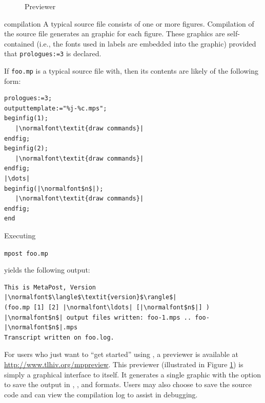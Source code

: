 \begin{figure}
	\begin{center}
		\caption{\MP{} Previewer}\label{fig:previewer}
	\end{center}
\end{figure}

\begin{section}{\MP{} compilation}
A typical \MP{} source file consists of one or more figures.  Compilation of the source file generates an \EPS{} graphic for each figure.  These \EPS{} graphics are self-contained (i.e., the fonts used in labels are embedded into the graphic) provided that \lstinline{prologues:=3} is declared.

If \texttt{foo.mp} is a typical \MP{} source file with, then its contents are likely of the following form:
\begin{lstlisting}[xleftmargin=1.25\parindent]
prologues:=3;
outputtemplate:="%j-%c.mps";
beginfig(1);
   |\normalfont\textit{draw commands}|
endfig;
beginfig(2);
   |\normalfont\textit{draw commands}|
endfig;
|\dots|
beginfig(|\normalfont$n$|);
   |\normalfont\textit{draw commands}|
endfig;
end
\end{lstlisting}
Executing \begin{flushleft}\hspace*{1.25\parindent}\texttt{mpost foo.mp}\end{flushleft} yields the following output:
\begin{lstlisting}[xleftmargin=1.25\parindent]
This is MetaPost, Version |\normalfont$\langle$\textit{version}$\rangle$|
(foo.mp [1] [2] |\normalfont\ldots| [|\normalfont$n$|] )
|\normalfont$n$| output files written: foo-1.mps .. foo-|\normalfont$n$|.mps
Transcript written on foo.log.
\end{lstlisting}

For users who just want to ``get started'' using \MP{}, a \MP{} previewer is available at \url{http://www.tlhiv.org/mppreview}.  This previewer (illustrated in Figure \ref{fig:previewer}) is simply a graphical interface to \MP{} itself.
It generates a single graphic with the option to save the output in \EPS{}, \PDF{}, and \SVG{} formats.  Users may also choose to save the source code and can view the compilation log to assist in debugging.
\end{section}
